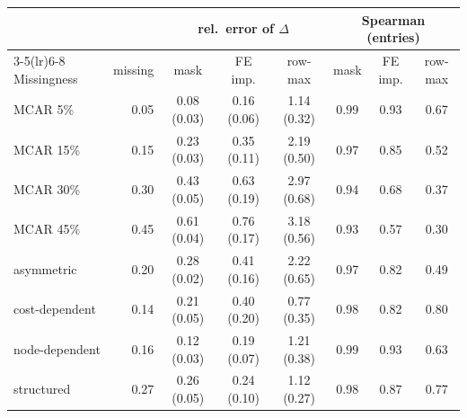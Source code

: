 \begin{tabular}{lrcccccc}
\toprule
 & & \multicolumn{3}{c}{rel.\ error of $\Delta$} & \multicolumn{3}{c}{Spearman (entries)}\\
\cmidrule(lr){3-5}\cmidrule(lr){6-8}
Missingness & missing & mask & FE imp. & row-max & mask & FE imp. & row-max\\
\midrule
MCAR 5\% & 0.05 & 0.08 (0.03) & 0.16 (0.06) & 1.14 (0.32) & 0.99 & 0.93 & 0.67\\
MCAR 15\% & 0.15 & 0.23 (0.03) & 0.35 (0.11) & 2.19 (0.50) & 0.97 & 0.85 & 0.52\\
MCAR 30\% & 0.30 & 0.43 (0.05) & 0.63 (0.19) & 2.97 (0.68) & 0.94 & 0.68 & 0.37\\
MCAR 45\% & 0.45 & 0.61 (0.04) & 0.76 (0.17) & 3.18 (0.56) & 0.93 & 0.57 & 0.30\\
asymmetric & 0.20 & 0.28 (0.02) & 0.41 (0.16) & 2.22 (0.65) & 0.97 & 0.82 & 0.49\\
cost-dependent & 0.14 & 0.21 (0.05) & 0.40 (0.20) & 0.77 (0.35) & 0.98 & 0.82 & 0.80\\
node-dependent & 0.16 & 0.12 (0.03) & 0.19 (0.07) & 1.21 (0.38) & 0.99 & 0.93 & 0.63\\
structured & 0.27 & 0.26 (0.05) & 0.24 (0.10) & 1.12 (0.27) & 0.98 & 0.87 & 0.77\\
\bottomrule
\end{tabular}
